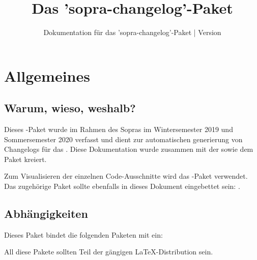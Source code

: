 \documentclass{sopra-base}
\title{Das 'sopra-changelog'-Paket}
\subtitle[Dokumentation für das 'sopra-changelog'-Paket]{Dokumentation für das 'sopra-changelog'-Paket | Version \thesocversion}
\begin{document}
    \maketitle%
%
%

%
%
%
%

\section{Allgemeines}
\subsection{Warum, wieso, weshalb?}
    Dieses \LaTeXe-Paket wurde im Rahmen des Sopras im
    Wintersemester 2019 und Sommersemester 2020 verfasst und dient zur automatischen generierung von Changelogs für das . Diese Dokumentation wurde zusammen mit der
     sowie dem Paket  kreiert.\par
    Zum Visualisieren der einzelnen Code-Ausschnitte wird das
    -Paket verwendet.
    Das zugehörige Paket sollte ebenfalls in dieses Dokument eingebettet sein: . 
\subsection{Abhängigkeiten}
    Dieses Paket bindet die folgenden Paketen mit ein:
    \begin{multicols}{4}
    \end{multicols}
    All diese Pakete sollten Teil der gängigen \LaTeX-Distribution sein.
\end{document}
